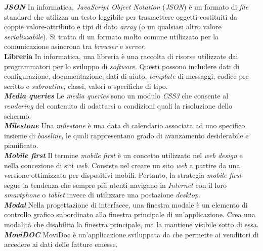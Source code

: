 \textbf{\textit{JSON}} In informatica, \textit{JavaScript Object Notation} (\textit{JSON}) è un formato di \textit{file} standard che utilizza un testo leggibile per trasmettere oggetti costituiti da coppie valore-attributo e tipi di dato \textit{array} (o un qualsiasi altro valore \textit{serializzabile}). Si tratta di un formato molto comune utilizzato per la comunicazione asincrona tra \textit{browser} e \textit{server}.\\

\textbf{Libreria} In informatica, una libreria è una raccolta di risorse utilizzate dai programmatori per lo sviluppo di \textit{software}. Questi possono includere dati di configurazione, documentazione, dati di aiuto, \textit{template} di messaggi, codice pre-scritto e \textit{subroutine}, classi, valori o specifiche di tipo.\\

\textbf{\textit{Media queries}} Le \textit{media queries} sono un modulo \textit{CSS3} che consente al \textit{rendering} del contenuto di adattarsi a condizioni quali la risoluzione dello schermo.\\

\textbf{\textit{Milestone}} Una \textit{milestone} è una data di calendario associata ad uno specifico insieme di \textit{baseline}, le quali rappresentano grado di avanzamento desiderabile e pianificato.\\

\textbf{\textit{Mobile first}} Il termine \textit{mobile first} è un concetto utilizzato nel \textit{web design} e nella concezione di siti \textit{web}. Consiste nel creare un sito \textit{web} a partire da una versione ottimizzata per dispositivi mobili. Pertanto, la strategia \textit{mobile first} segue la tendenza che sempre più utenti navigano in \textit{Internet} con il loro \textit{smartphone} o \textit{tablet} invece di utilizzare una postazione \textit{desktop}.\\

\textbf{\textit{Modal}} Nella progettazione di interfacce, una finestra modale è un elemento di controllo grafico subordinato alla finestra principale di un'applicazione. Crea una modalità che disabilita la finestra principale, ma la mantiene visibile sotto di essa.\\

\textbf{\textit{MoviDOC}} MoviDoc è un'applicazione sviluppata da \visione{} che permette ai venditori di accedere ai dati delle fatture emesse.\\

